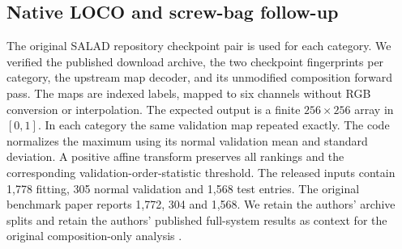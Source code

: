 \subsection{Native LOCO and screw-bag follow-up}
The original SALAD repository checkpoint pair is used for each category. We verified the published download archive, the two checkpoint fingerprints per category, the upstream map decoder, and its unmodified composition forward pass. The maps are indexed labels, mapped to six channels without RGB conversion or interpolation. The expected output is a finite $256\times256$ array in $[0,1]$. In each category the same validation map repeated exactly. The code normalizes the maximum using its normal validation mean and standard deviation. A positive affine transform preserves all rankings and the corresponding validation-order-statistic threshold. The released inputs contain 1,778 fitting, 305 normal validation and 1,568 test entries. The original benchmark paper reports 1,772, 304 and 1,568. We retain the authors' archive splits and retain the authors' published full-system results as context for the original composition-only analysis \cite{fucka2025}.

\begin{table}[t]
\centering
\caption{\textbf{Native map scores and composition branch alerts.} AUROC in percent. Pos/good counts positives and their eligible negative comparison images. Cutoffs come from normal validation only and stay fixed across scopes. Macro AUROC weights categories equally. Macro alert counts add images. Pushpins has no eligible matched signature.}
\label{tab:locodetail}
\scriptsize
\setlength{\tabcolsep}{4pt}

\end{table}


